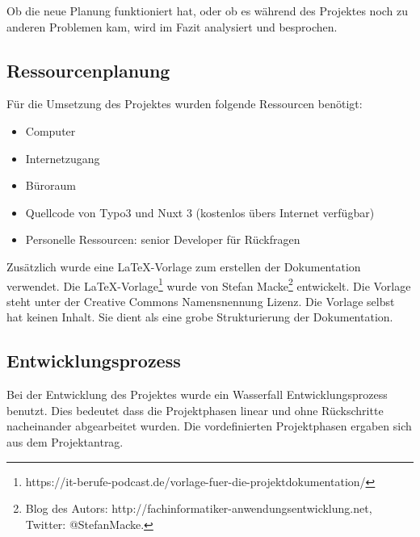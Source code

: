Ob die neue Planung funktioniert hat, oder ob es während des Projektes noch zu anderen Problemen kam, wird im Fazit analysiert und besprochen.

\subsection{Ressourcenplanung}
\label{sec:Ressourcenplanung}

Für die Umsetzung des Projektes wurden folgende Ressourcen benötigt:
\begin{itemize}
	\item Computer
	\item Internetzugang
	\item Büroraum
	\item Quellcode von Typo3 und Nuxt 3 (kostenlos übers Internet verfügbar)
	\item Personelle Ressourcen: senior Developer für Rückfragen
\end{itemize}

Zusätzlich wurde eine LaTeX-Vorlage zum erstellen der Dokumentation verwendet.  Die LaTeX-Vorlage\footnote{\Vgl https://it-berufe-podcast.de/vorlage-fuer-die-projektdokumentation/} wurde von Stefan Macke\footnote{\Vgl Blog des Autors: http://fachinformatiker-anwendungsentwicklung.net, Twitter: @StefanMacke.} entwickelt. Die Vorlage steht unter der Creative Commons Namensnennung Lizenz. Die Vorlage selbst hat keinen Inhalt. Sie dient als eine grobe Strukturierung der Dokumentation.

\subsection{Entwicklungsprozess}
\label{sec:Entwicklungsprozess}

Bei der Entwicklung des Projektes wurde ein Wasserfall Entwicklungsprozess benutzt. Dies bedeutet dass die Projektphasen linear und ohne Rückschritte nacheinander abgearbeitet wurden. Die vordefinierten Projektphasen ergaben sich aus dem Projektantrag.

